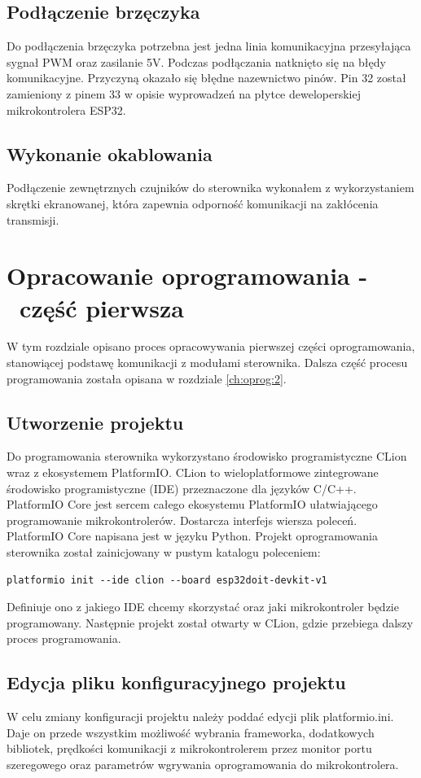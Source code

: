 \documentclass[11pt]{report}
\begin{document}
 \section{Podłączenie brzęczyka}
 Do podłączenia brzęczyka potrzebna jest jedna linia komunikacyjna przesyłająca sygnał PWM oraz zasilanie 5V. 
 Podczas podłączania natknięto się na błędy komunikacyjne. Przyczyną okazało się błędne nazewnictwo pinów. Pin 32 został zamieniony z pinem 33 w opisie wyprowadzeń na płytce deweloperskiej mikrokontrolera ESP32.
 
 
 \section{Wykonanie okablowania}
 Podłączenie zewnętrznych czujników do sterownika wykonałem z wykorzystaniem skrętki ekranowanej, która zapewnia odporność komunikacji na zakłócenia transmisji.
 
 
 \chapter{Opracowanie oprogramowania -~część pierwsza}\label{ch:oprog:1}
 W tym rozdziale opisano proces opracowywania pierwszej części oprogramowania, stanowiącej podstawę komunikacji z modułami sterownika. Dalsza część procesu programowania została opisana w rozdziale \ref{ch:oprog:2}.
 
 \section{Utworzenie projektu}
 Do programowania sterownika wykorzystano środowisko programistyczne CLion wraz z ekosystemem PlatformIO.
 CLion to wieloplatformowe zintegrowane środowisko programistyczne (IDE) przeznaczone dla języków C/C++.
 PlatformIO Core jest sercem całego ekosystemu PlatformIO ułatwiającego programowanie mikrokontrolerów. Dostarcza interfejs wiersza poleceń. PlatformIO Core napisana jest w języku Python.
 Projekt oprogramowania sterownika został zainicjowany w pustym katalogu poleceniem:
 \begin{lstlisting}
platformio init --ide clion --board esp32doit-devkit-v1 
 \end{lstlisting}
 Definiuje ono z jakiego IDE chcemy skorzystać oraz jaki mikrokontroler będzie programowany.
 Następnie projekt został otwarty w CLion, gdzie przebiega dalszy proces programowania.
 
 \section{Edycja pliku konfiguracyjnego projektu}
 W celu zmiany konfiguracji projektu należy poddać edycji plik platformio.ini. Daje on przede wszystkim możliwość wybrania frameworka, dodatkowych bibliotek, prędkości komunikacji z mikrokontrolerem przez monitor portu szeregowego oraz parametrów wgrywania oprogramowania do mikrokontrolera.
 
\end{document}
